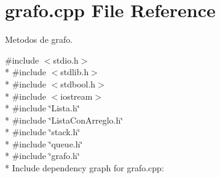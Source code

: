 \section{grafo.\+cpp File Reference}
\label{grafo_8cpp}


Metodos de grafo.  


{\ttfamily \#include $<$stdio.\+h$>$}\\*
{\ttfamily \#include $<$stdlib.\+h$>$}\\*
{\ttfamily \#include $<$stdbool.\+h$>$}\\*
{\ttfamily \#include $<$iostream$>$}\\*
{\ttfamily \#include \char`\"{}Lista.\+h\char`\"{}}\\*
{\ttfamily \#include \char`\"{}Lista\+Con\+Arreglo.\+h\char`\"{}}\\*
{\ttfamily \#include \char`\"{}stack.\+h\char`\"{}}\\*
{\ttfamily \#include \char`\"{}queue.\+h\char`\"{}}\\*
{\ttfamily \#include \char`\"{}grafo.\+h\char`\"{}}\\*
Include dependency graph for grafo.\+cpp\+:
